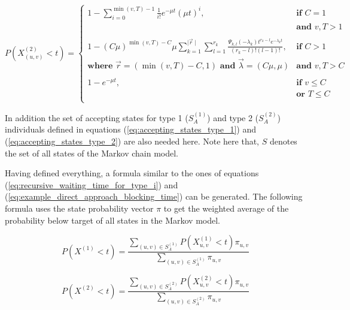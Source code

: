 \begin{equation}
    P(X_{(u,v)}^{(2)} < t) =
    \begin{cases}
        1 - \sum_{i=0}^{\min(v,T)-1} \frac{1}{i!} e^{-\mu t} (\mu t)^i,
            & \textbf{if } C = 1 \\
        & \textbf{and } v, T > 1 \\
        & \\
        1 - (C \mu ) ^ {\min(v,T) - C} \mu
            \sum_{k=1}^{\mid \vec{r} \mid} \sum_{l=1}^{r_k}
            \frac{\Psi_{k,l}(-\lambda_k)t^{r_k - l}
            e^{-\lambda_k t}}{(r_k - l)! (l - 1)!},
            & \textbf{if } C > 1 \\
        \textbf{where } \vec{r}=(\min(v, T) - C, 1) \textbf{ and }
            \vec{\lambda}=(C \mu, \mu) & \textbf{and } v, T  > C \\
        & \\
        1 - e^{-\mu t}, & \textbf{if } v \leq C \\
        & \textbf{or } T \leq C \\
    \end{cases}
\end{equation}
\normalsize

In addition the set of accepting states for type 1 (\(S_A^{(1)}\)) and type 2
(\(S_A^{(2)}\)) individuals defined in equations
(\ref{eq:accepting_states_type_1}) and (\ref{eq:accepting_states_type_2}) are
also needed here.
Note here that, \(S\) denotes the set of all states of the Markov chain model.


Having defined everything, a formula similar to the ones
of equations (\ref{eq:recursive_waiting_time_for_type_i}) and
(\ref{eq:example_direct_approach_blocking_time}) can be generated.
The following formula uses the state probability vector \(\pi\) to get the
weighted average of the probability below target of all states in the Markov
model.

\begin{equation}\label{eq:proportion_of_inds_type_1}
    P(X^{(1)} < t) = \frac{\sum_{(u,v) \in S_A^{(1)}} P(X_{u,v}^{(1)} < t)
    \pi_{u,v} }{\sum_{(u,v) \in S_A^{(1)}} \pi_{u,v}}
\end{equation}

\begin{equation}\label{eq:proportion_of_inds_type_2}
    P(X^{(2)} < t) = \frac{\sum_{(u,v) \in S_A^{(2)}} P(X_{u,v}^{(2)} < t)
    \pi_{u,v} }{\sum_{(u,v) \in S_A^{(2)}} \pi_{u,v}}
\end{equation}


